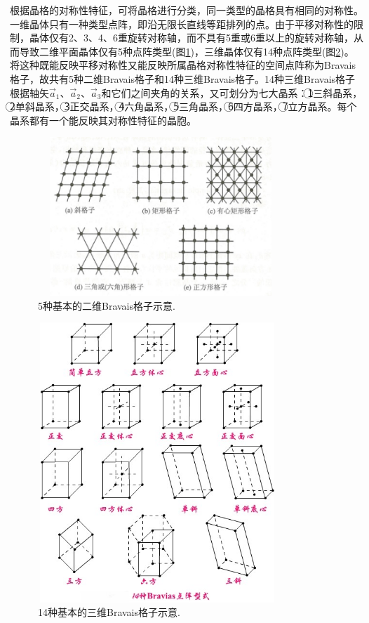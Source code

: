 根据晶格的对称性特征，可将晶格进行分类，同一类型的晶格具有相同的对称性。一维晶体只有一种类型点阵，即沿无限长直线等距排列的点。由于平移对称性的限制，晶体仅有2、3、4、6重旋转对称轴，而不具有5重或6重以上的旋转对称轴，从而导致二维平面晶体仅有5种点阵类型(图\ref{Fig:Lattice_Type-2D})，三维晶体仅有14种点阵类型(图\ref{Fig:Lattice_Type-3D})。将这种既能反映平移对称性又能反映所属晶格对称性特征的空间点阵称为Bravais格子，故共有5种二维Bravais格子和14种三维Bravais格子。14种三维Bravais格子根据轴矢$\vec a_1$、$\vec a_2$、$\vec a_3$和它们之间夹角的关系，又可划分为七大晶系：\textcircled{1}三斜晶系，\textcircled{2}单斜晶系，\textcircled{3}正交晶系，\textcircled{4}六角晶系，\textcircled{5}三角晶系，\textcircled{6}四方晶系，\textcircled{7}立方晶系。每个晶系都有一个能反映其对称性特征的晶胞。
\begin{figure}[h!]
\centering
\vspace*{-0.05in}
\includegraphics[height=2.35in,width=3.65in,viewport=0 0 90 60,clip]{Figures/Bravais_Lattice-2D.jpg}
\caption{\small \textrm{5种基本的二维Bravais格子示意.}}%
\label{Fig:Lattice_Type-2D}
\end{figure}

\begin{figure}[h!]
\centering
\vspace*{-0.05in}
\includegraphics[height=4.15in,width=3.55in,viewport=0 25 487 581,clip]{Figures/Bravais_Lattice-3D.jpg}
\caption{\small \textrm{14种基本的三维Bravais格子示意.}}%
\label{Fig:Lattice_Type-3D}
\end{figure}


